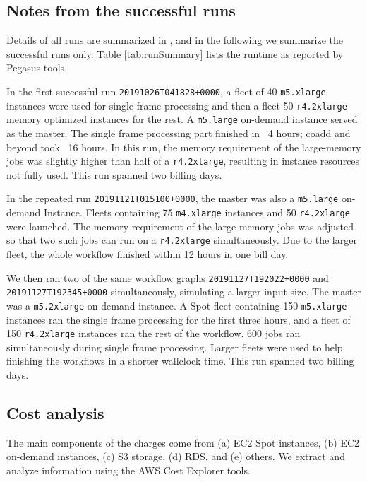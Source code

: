 \subsection{Notes from the successful runs}

Details of all runs are summarized in , and in the following we summarize the successful runs only.
Table \ref{tab:runSummary} lists the runtime as reported by Pegasus tools.



In the first successful run \texttt{20191026T041828+0000}, a fleet of 40 \texttt{m5.xlarge} instances were used for single frame processing and then a fleet 50 \texttt{r4.2xlarge} memory optimized instances for the rest.
A \texttt{m5.large} on-demand instance served as the master.
The single frame processing part finished in ~4 hours; coadd and beyond took ~16 hours.
In this run, the memory requirement of the large-memory jobs was slightly higher than half of a \texttt{r4.2xlarge}, resulting in instance resources not fully used.
This run spanned two billing days.

In the repeated run \texttt{20191121T015100+0000}, the master was also a \texttt{m5.large} on-demand Instance.
Fleets containing 75 \texttt{m4.xlarge} instances and 50 \texttt{r4.2xlarge} were launched.
The memory requirement of the large-memory jobs was adjusted so that two such jobs can run on a \texttt{r4.2xlarge} simultaneously.
Due to the larger fleet, the whole workflow finished within 12 hours in one bill day.

We then ran two of the same workflow graphs \texttt{20191127T192022+0000} and \texttt{20191127T192345+0000} simultaneously, simulating a larger input size.
The master was a \texttt{m5.2xlarge} on-demand instance.
A Spot fleet containing 150 \texttt{m5.xlarge} instances ran the single frame processing for the first three hours, and a fleet of 150 \texttt{r4.2xlarge} instances ran the rest of the workflow.
600 jobs ran simultaneously during single frame processing.
Larger fleets were used to help finishing the workflows in a shorter wallclock time.
This run spanned two billing days.

\subsection{Cost analysis}

The main components of the charges come from (a) EC2 Spot instances, (b) EC2 on-demand instances, (c) S3 storage, (d) RDS, and (e) others.
We extract and analyze information using the AWS Cost Explorer tools.

